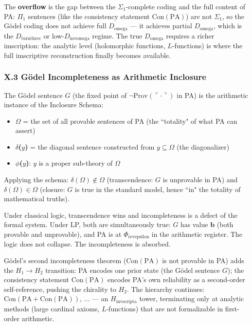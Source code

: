 \documentclass[12pt,a4paper]{article}
\begin{document}
The \textbf{overflow} is the gap between the $\Sigma_1$-complete coding and the full content of PA: $\Pi_1$ sentences (like the consistency statement $\text{Con}(\text{PA})$) are not $\Sigma_1$, so the G\"odel coding does not achieve full $D_{\text{omega}}$ --- it achieves partial $D_{\text{omega}}$, which is the $D_{\text{turnthree}}$ or low-$D_{\text{invomega}}$ regime. The true $D_{\text{omega}}$ requires a richer imscription: the analytic level (holomorphic functions, $L$-functions) is where the full imscriptive reconstruction finally becomes available.

\subsubsection{X.3 G\"odel Incompleteness as Arithmetic Inclosure}
The G\"odel sentence $G$ (the fixed point of $\neg\text{Prov}(\ulcorner \cdot \urcorner)$ in PA) is the arithmetic instance of the Inclosure Schema:
\begin{itemize}
\item \textbf{$\Omega$} = the set of all provable sentences of PA (the ``totality" of what PA can assert)
\item \textbf{$\delta$($y$)} = the diagonal sentence constructed from $y \subseteq \Omega$ (the diagonalizer)
\item \textbf{$\phi$($y$)}: $y$ is a proper sub-theory of $\Omega$
\end{itemize}
Applying the schema: $\delta(\Omega) \notin \Omega$ (transcendence: $G$ is unprovable in PA) and $\delta(\Omega) \in \Omega$ (closure: $G$ is true in the standard model, hence ``in" the totality of mathematical truths).

Under classical logic, transcendence wins and incompleteness is a defect of the formal system. Under LP, both are simultaneously true: $G$ has value $\mathbf{b}$ (both provable and unprovable), and PA is at $\Phi_{\text{revepsilon}}$ in the arithmetic register. The logic does not collapse. The incompleteness is absorbed.

G\"odel's second incompleteness theorem ($\text{Con}(\text{PA})$ is not provable in PA) adds the $H_1 \to H_2$ transition: PA encodes one prior state (the G\"odel sentence $G$); the consistency statement $\text{Con}(\text{PA})$ encodes PA's own reliability as a second-order self-reference, pushing the chirality to $H_2$. The hierarchy continues: $\text{Con}(\text{PA} + \text{Con}(\text{PA}))$, $\ldots$ --- an $H_{\text{invscripta}}$ tower, terminating only at analytic methods (large cardinal axioms, $L$-functions) that are not formalizable in first-order arithmetic.
\end{document}
